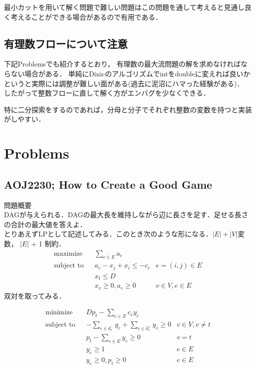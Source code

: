 \documentclass[13pt, a4paper, landscape]{jarticle}
\theoremstyle{nonitalic} %
\begin{document}
最小カットを用いて解く問題で難しい問題はこの問題を通して考えると見通し良く考えることができる場合があるので有用である．



\subsection{有理数フローについて注意}

下記Problemsでも紹介するとおり， 有理数の最大流問題の解を求めなければならない場合がある． 単純にDinicのアルゴリズムでintをdoubleに変えれば良いかというと実際には調整が難しい面がある(過去に泥沼にハマった経験がある)． したがって整数フローに直して解く方がエンバグを少なくできる．

特に二分探索をするのであれば，分母と分子でそれぞれ整数の変数を持つと実装がしやすい．



\section{Problems}

\subsection{AOJ2230; How to Create a Good Game}

問題概要 \\
DAGが与えられる．DAGの最大長を維持しながら辺に長さを足す．足せる長さの合計の最大値を答えよ．\\

とりあえずLPとして記述してみる．このとき次のような形になる．$|E|+|V|$変数， $|E|$ + 1 制約．
\begin{align}
 &&&&&\textrm{maximize}   && \sum_{e \in E} a_e \\
 &&&&&\textrm{subject to} && a_e - x_j + x_i \leq - c_e & e = (i,j) \in E  &&&&&\\
 &&&&&                    && x_t \leq  D &&&&&& \\
 &&&&&                    && x_v \geq 0, a_e \geq 0 & v \in V, e \in E &&&&&
\end{align}
双対を取ってみる．

\begin{align}
  &&&&& \textrm{minimize}   && Dp_t - \sum_{e \in E} c_e y_e \\
  &&&&& \textrm{subject to} && -\sum_{e \in \delta_v^- } y_e + \sum_{e \in \delta_v^+ } y_e \geq 0 & v \in V, v\neq t &&&&&\\
  &&&&&                     && p_t - \sum_{e \in E} y_e \geq 0 & v=t \\
  &&&&&                     && y_e \geq 1  & e \in E\\
  &&&&&                     && y_e \geq 0, p_t \geq 0 & e\in E
\end{align}
\end{document}
